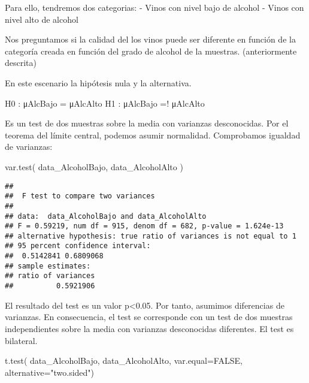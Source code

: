 \documentclass[
]{article}
\newenvironment{Shaded}{\begin{snugshade}}{\end{snugshade}}
\newcommand{\AttributeTok}[1]{\textcolor[rgb]{0.77,0.63,0.00}{#1}}
\newcommand{\ConstantTok}[1]{\textcolor[rgb]{0.00,0.00,0.00}{#1}}
\newcommand{\FloatTok}[1]{\textcolor[rgb]{0.00,0.00,0.81}{#1}}
\newcommand{\FunctionTok}[1]{\textcolor[rgb]{0.00,0.00,0.00}{#1}}
\newcommand{\NormalTok}[1]{#1}
\newcommand{\OtherTok}[1]{\textcolor[rgb]{0.56,0.35,0.01}{#1}}
\newcommand{\SpecialCharTok}[1]{\textcolor[rgb]{0.00,0.00,0.00}{#1}}
\newcommand{\StringTok}[1]{\textcolor[rgb]{0.31,0.60,0.02}{#1}}
\begin{document}
Para ello, tendremos dos categorias: - Vinos con nivel bajo de alcohol -
Vinos con nivel alto de alcohol

\begin{Shaded}
\end{Shaded}

Nos preguntamos si la calidad del los vinos puede ser diferente en
función de la categoría creada en función del grado de alcohol de la
muestras. (anteriormente descrita)

En este escenario la hipótesis nula y la alternativa.

H0 : μAlcBajo = μAlcAlto H1 : μAlcBajo =! μAlcAlto

Es un test de dos muestras sobre la media con varianzas desconocidas.
Por el teorema del límite central, podemos asumir normalidad.
Comprobamos igualdad de varianzas:

\begin{Shaded}
\begin{Highlighting}[]
\FunctionTok{var.test}\NormalTok{( data\_AlcoholBajo, data\_AlcoholAlto )}
\end{Highlighting}
\end{Shaded}

\begin{verbatim}
## 
##  F test to compare two variances
## 
## data:  data_AlcoholBajo and data_AlcoholAlto
## F = 0.59219, num df = 915, denom df = 682, p-value = 1.624e-13
## alternative hypothesis: true ratio of variances is not equal to 1
## 95 percent confidence interval:
##  0.5142841 0.6809068
## sample estimates:
## ratio of variances 
##          0.5921906
\end{verbatim}

El resultado del test es un valor p\textless0.05. Por tanto, asumimos
diferencias de varianzas. En consecuencia, el test se corresponde con un
test de dos muestras independientes sobre la media con varianzas
desconocidas diferentes. El test es bilateral.

\begin{Shaded}
\begin{Highlighting}[]
\FunctionTok{t.test}\NormalTok{( data\_AlcoholBajo, data\_AlcoholAlto,}
\AttributeTok{var.equal=}\ConstantTok{FALSE}\NormalTok{, }\AttributeTok{alternative=}\StringTok{"two.sided"}\NormalTok{)}
\end{Highlighting}
\end{Shaded}
\end{document}
